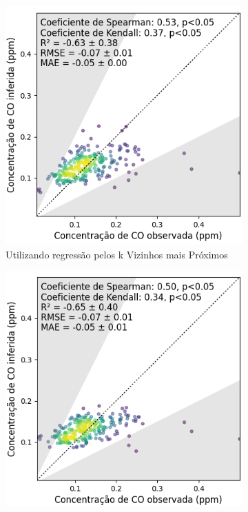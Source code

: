 \begin{figure}[h]
    \centering
    \caption{Gráfico de dispersão das leituras do sensor CO-B4 e a estação de referência após aplicar modelos de regressão considerando a temperatura}
    \begin{subfigure}{0.495\textwidth}
        \includegraphics[width=\textwidth]{chapters/4-CALIBRAÇÃO MÚLTIPLOS SENSORES/Figuras/co-b4-T-KNN-Regression.png}
        \caption{Utilizando regressão pelos k Vizinhos mais Próximos}
        \label{fig:data-co-T-reference-corr-KNN}
    \end{subfigure}
    \hfill
    \begin{subfigure}{0.495\textwidth}
        \includegraphics[width=\textwidth]{chapters/4-CALIBRAÇÃO MÚLTIPLOS SENSORES/Figuras/co-b4-T-MLP-Regression.png}

\end{subfigure}
\end{figure}
